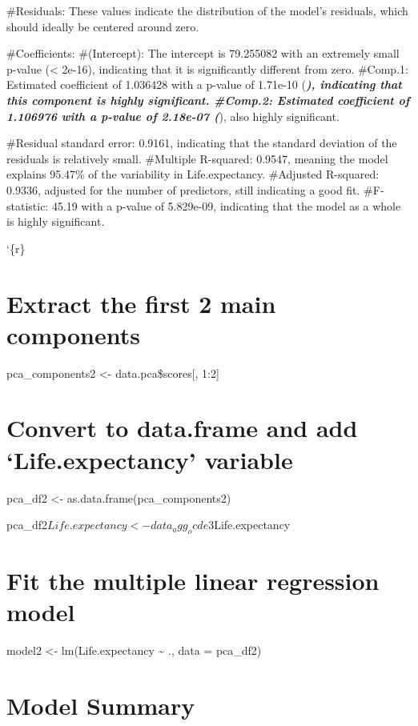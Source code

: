\documentclass[
]{article}
\begin{document}
\#Residuals: These values indicate the distribution of the model's
residuals, which should ideally be centered around zero.

\#Coefficients: \#(Intercept): The intercept is 79.255082 with an
extremely small p-value (\textless{} 2e-16), indicating that it is
significantly different from zero. \#Comp.1: Estimated coefficient of
1.036428 with a p-value of 1.71e-10 (\textbf{\emph{), indicating that
this component is highly significant. \#Comp.2: Estimated coefficient of
1.106976 with a p-value of 2.18e-07 (}}), also highly significant.

\#Residual standard error: 0.9161, indicating that the standard
deviation of the residuals is relatively small. \#Multiple R-squared:
0.9547, meaning the model explains 95.47\% of the variability in
Life.expectancy. \#Adjusted R-squared: 0.9336, adjusted for the number
of predictors, still indicating a good fit. \#F-statistic: 45.19 with a
p-value of 5.829e-09, indicating that the model as a whole is highly
significant.

`\{r\}

\section{Extract the first 2 main
components}\label{extract-the-first-2-main-components}

pca\_components2 \textless- data.pca\$scores{[}, 1:2{]}

\section{Convert to data.frame and add `Life.expectancy'
variable}\label{convert-to-data.frame-and-add-life.expectancy-variable}

pca\_df2 \textless- as.data.frame(pca\_components2)

pca\_df2\(Life.expectancy <- data_agg_ocde3\)Life.expectancy

\section{Fit the multiple linear regression
model}\label{fit-the-multiple-linear-regression-model}

model2 \textless- lm(Life.expectancy \textasciitilde{} ., data =
pca\_df2)

\section{Model Summary}\label{model-summary}
\end{document}
